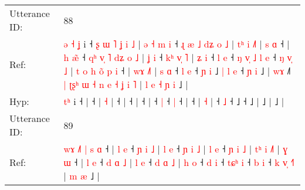\documentclass[10pt]{article}
\DeclareRobustCommand{\hl}[1]{{\textcolor{red}{#1}}}
\begin{document}
\begin{longtable}{ll}
 \\
\midrule
Utterance ID: & 88 \\
Ref: & \hl{ə}\hl{ }\hl{˧}\hl{ }\hl{ʝ} i ˧\hl{ }\hl{ʂ}\hl{ }\hl{ɯ}\hl{ }\hl{˥}\hl{ }\hl{ʝ}\hl{ }\hl{i}\hl{ }\hl{˩} |\hl{ }\hl{ə}\hl{ }\hl{˧}\hl{ }\hl{m}\hl{ }\hl{i} ˧\hl{ }\hl{ɻ}\hl{ }\hl{æ}\hl{ }\hl{˩}\hl{ }\hl{d}\hl{ʑ}\hl{ }\hl{o}\hl{ }\hl{˩} |\hl{ }\hl{t}\hl{ʰ}\hl{ }\hl{i} \hl{˩}\hl{˥} |\hl{ }\hl{s}\hl{ }\hl{ɑ} ˧ |\hl{ }\hl{h}\hl{ }\hl{æ}\hl{̃} ˧\hl{ }\hl{q}\hl{ʰ}\hl{ }\hl{v}\hl{̩}\hl{ }\hl{˥}\hl{ }\hl{d}\hl{ʑ}\hl{ }\hl{o}\hl{ }\hl{˩} |\hl{ }\hl{ʝ}\hl{ }\hl{i} ˧\hl{ }\hl{k}\hl{ʰ}\hl{ }\hl{v}\hl{̩}\hl{ }\hl{˥} |\hl{ }\hl{ʑ}\hl{ }\hl{i} ˧\hl{ }\hl{l} \hl{e} ˧\hl{ }\hl{ŋ}\hl{ }\hl{v}\hl{̩}\hl{ }\hl{˩}\hl{ }\hl{l} \hl{e} ˧\hl{ }\hl{ŋ}\hl{ }\hl{v}\hl{̩}\hl{ }\hl{˩} |\hl{ }\hl{t}\hl{ }\hl{o}\hl{ }\hl{h}\hl{ }\hl{o}\hl{̃}\hl{ }\hl{p}\hl{ }\hl{i} ˧ |\hl{ }\hl{w}\hl{ɤ} \hl{˩}\hl{˥} |\hl{ }\hl{s}\hl{ }\hl{ɑ} ˧\hl{ }\hl{l} \hl{e} ˧\hl{ }\hl{ɲ}\hl{ }\hl{i} ˩\hl{ }\hl{|}\hl{ }\hl{l}\hl{ }\hl{e} ˧\hl{ }\hl{ɲ}\hl{ }\hl{i} ˩ |\hl{ }\hl{w}\hl{ɤ} ˩\hl{˥}\hl{ }\hl{|}\hl{ }\hl{ʈ}\hl{ʂ}\hl{ʰ}\hl{ }\hl{ɯ}\hl{ }\hl{˧}\hl{ }\hl{n}\hl{ }\hl{e}\hl{ }\hl{˧}\hl{ }\hl{ʝ}\hl{ }\hl{i}\hl{ }\hl{˥} |\hl{ }\hl{l}\hl{ }\hl{e}\hl{ }\hl{˧}\hl{ }\hl{ɲ}\hl{ }\hl{i} ˩ |
 \\
Hyp: & \hl{}\hl{}\hl{}\hl{t}\hl{ʰ} i ˧\hl{}\hl{}\hl{}\hl{}\hl{}\hl{}\hl{}\hl{}\hl{}\hl{}\hl{}\hl{} |\hl{}\hl{}\hl{}\hl{}\hl{}\hl{}\hl{}\hl{} ˧\hl{}\hl{}\hl{}\hl{}\hl{}\hl{}\hl{}\hl{}\hl{}\hl{}\hl{}\hl{}\hl{} |\hl{}\hl{}\hl{}\hl{}\hl{} \hl{}\hl{˧} |\hl{}\hl{}\hl{}\hl{} ˧ |\hl{}\hl{}\hl{}\hl{}\hl{} ˧\hl{}\hl{}\hl{}\hl{}\hl{}\hl{}\hl{}\hl{}\hl{}\hl{}\hl{}\hl{}\hl{}\hl{}\hl{} |\hl{}\hl{}\hl{}\hl{} ˧\hl{}\hl{}\hl{}\hl{}\hl{}\hl{}\hl{}\hl{} |\hl{}\hl{}\hl{}\hl{} ˧\hl{}\hl{} \hl{|} ˧\hl{}\hl{}\hl{}\hl{}\hl{}\hl{}\hl{}\hl{}\hl{} \hl{|} ˧\hl{}\hl{}\hl{}\hl{}\hl{}\hl{}\hl{} |\hl{}\hl{}\hl{}\hl{}\hl{}\hl{}\hl{}\hl{}\hl{}\hl{}\hl{}\hl{}\hl{} ˧ |\hl{}\hl{}\hl{} \hl{}\hl{˧} |\hl{}\hl{}\hl{}\hl{} ˧\hl{}\hl{} \hl{˩} ˧\hl{}\hl{}\hl{}\hl{} ˩\hl{}\hl{}\hl{}\hl{}\hl{}\hl{} ˧\hl{}\hl{}\hl{}\hl{} ˩ |\hl{}\hl{}\hl{} ˩\hl{}\hl{}\hl{}\hl{}\hl{}\hl{}\hl{}\hl{}\hl{}\hl{}\hl{}\hl{}\hl{}\hl{}\hl{}\hl{}\hl{}\hl{}\hl{}\hl{}\hl{}\hl{}\hl{} |\hl{}\hl{}\hl{}\hl{}\hl{}\hl{}\hl{}\hl{}\hl{}\hl{} ˩ |
 \\
\midrule
Utterance ID: & 89 \\
Ref: & \hl{w}\hl{ɤ}\hl{ }\hl{˩}\hl{˥}\hl{ }\hl{|}\hl{ }\hl{s} \hl{ɑ} ˧ |\hl{ }\hl{l}\hl{ }\hl{e} ˧\hl{ }\hl{ɲ}\hl{ }\hl{i}\hl{ }\hl{˩} |\hl{ }\hl{l}\hl{ }\hl{e} ˧\hl{ }\hl{ɲ}\hl{ }\hl{i}\hl{ }\hl{˩} |\hl{ }\hl{l}\hl{ }\hl{e} ˧\hl{ }\hl{ɲ}\hl{ }\hl{i}\hl{ }\hl{˩} |\hl{ }\hl{t}\hl{ʰ}\hl{ }\hl{i} \hl{˩}\hl{˥} |\hl{ }\hl{ɣ}\hl{ }\hl{ɯ} ˧ |\hl{ }\hl{l}\hl{ }\hl{e} ˧\hl{ }\hl{d}\hl{ }\hl{ɑ}\hl{ }\hl{˩} |\hl{ }\hl{l}\hl{ }\hl{e} ˧\hl{ }\hl{d}\hl{ }\hl{ɑ}\hl{ }\hl{˩} |\hl{ }\hl{h}\hl{ }\hl{o} ˧\hl{ }\hl{d} \hl{i} ˧\hl{ }\hl{t}\hl{ɕ}\hl{ʰ} \hl{i} ˧\hl{ }\hl{b} \hl{i} ˧ \hl{k} \hl{v}\hl{̩} \hl{˧}\hl{˥} | \hl{m} \hl{æ} ˩ |

\end{longtable}
\end{document}
